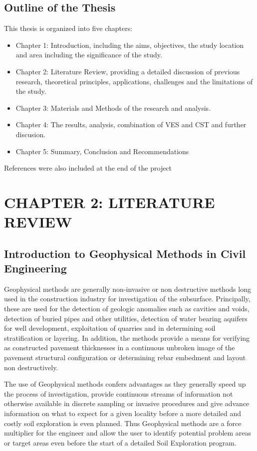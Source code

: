 \documentclass[12pt,a4paper]{report}
\begin{document}
\newpage
\section{Outline of the Thesis}
This thesis is organized into five chapters:
\begin{itemize}
    \item Chapter 1: Introduction, including the aims, objectives, the study location and area including the significance of the study.
    \item Chapter 2: Literature Review, providing a detailed discussion of previous research, theoretical principles, applications, challenges and the limitations of the study.
    \item Chapter 3: Materials and Methods of the research and analysis.
    \item Chapter 4: The results, analysis, combination of VES and CST and further discusion.
    \item Chapter 5: Summary, Conclusion and Recommendations
\end{itemize}
References were also included at the end of the project

\chapter{CHAPTER 2: LITERATURE REVIEW}

\section{Introduction to Geophysical Methods in Civil Engineering}
Geophysical methods are generally non-invasive or non destructive methods long used in the construction industry for investigation of the subsurface. Principally, these are used for the detection of geologic anomalies such as cavities and voids, detection of buried pipes and other utilities, detection of water bearing aquifers for well development, exploitation of quarries and in determining soil stratification or layering. In addition, the methods provide a means for verifying as constructed pavement thicknesses in a continuous unbroken image of the pavement structural configuration or determining rebar embedment and layout non destructively.

The use of Geophysical methods confers advantages as they generally speed up the process of investigation, provide continuous streams of information not otherwise available in discrete sampling or invasive procedures and give advance information on what to expect for a given locality before a more detailed and costly soil exploration is even planned. Thus Geophysical methods are a force multiplier for the engineer and allow the user to identify potential problem areas or target areas even before the start of a detailed Soil Exploration program.
\end{document}
